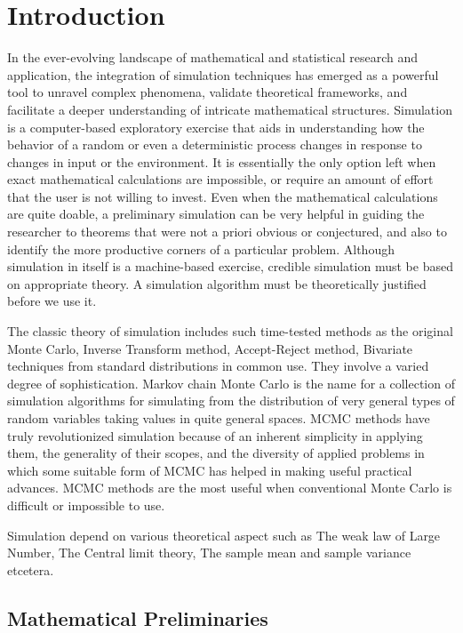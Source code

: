 \chapter{Introduction}

In the ever-evolving landscape of mathematical and statistical research and application, 
the integration of simulation techniques has emerged as a powerful tool to unravel complex phenomena, validate theoretical frameworks, 
and facilitate a deeper understanding of intricate mathematical structures. 
Simulation is a computer-based exploratory exercise that aids in understanding how
the behavior of a random or even a deterministic process changes in response to
changes in input or the environment. It is essentially the only option left when exact
mathematical calculations are impossible, or require an amount of effort that the user
is not willing to invest. Even when the mathematical calculations are quite doable, a
preliminary simulation can be very helpful in guiding the researcher to theorems that
were not a priori obvious or conjectured, and also to identify the more productive
corners of a particular problem. Although simulation in itself is a machine-based
exercise, credible simulation must be based on appropriate theory. A simulation
algorithm must be theoretically justified before we use it.

The classic theory of simulation includes such time-tested methods as the original Monte Carlo, 
Inverse Transform method, Accept-Reject method, Bivariate techniques  
from standard distributions in common use. They involve a varied degree of sophistication. 
Markov chain Monte Carlo is the name for a collection of simulation algorithms for simulating from
the distribution of very general types of random variables taking values in quite
general spaces. MCMC methods have truly revolutionized simulation because of an
inherent simplicity in applying them, the generality of their scopes, and the diversity
of applied problems in which some suitable form of MCMC has helped in making
useful practical advances. MCMC methods are the most useful when conventional
Monte Carlo is difficult or impossible to use.

Simulation depend on various theoretical aspect such as 
The weak law of Large Number, The Central limit theory, The sample mean and sample variance etcetera.

\section{Mathematical Preliminaries}

